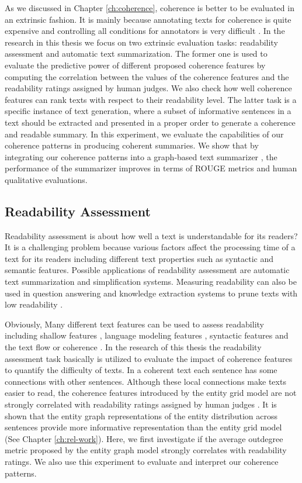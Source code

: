 As we discussed in Chapter \ref{ch:coherence}, coherence is better to be evaluated in an extrinsic fashion. 
It is mainly because annotating texts for coherence is quite expensive and controlling all conditions for annotators is very difficult \cite{karamanis04a}. 
In the research in this thesis we focus on two extrinsic evaluation tasks: readability assessment and automatic text summarization. 
The former one is used to evaluate the predictive power of different proposed coherence features by computing the correlation between the values of the coherence features and the readability ratings assigned by human judges. 
We also check how well coherence features can rank texts with respect to their readability level. 
The latter task is a specific instance of text generation, where a subset of informative sentences in a text should be extracted and presented in a proper order to generate a coherence and readable summary. 
In this experiment, we evaluate the capabilities of our coherence patterns in producing coherent summaries. 
We show that by integrating our coherence patterns into a graph-based text summarizer \cite{parveen15a}, the performance of the summarizer improves in terms of ROUGE metrics and human qualitative evaluations.

\subsection{Readability Assessment}
\label{subsec:readability_assessment}

Readability assessment is about how well a text is understandable for its readers? 
It is a challenging problem because various factors affect the processing time of a text for its readers including different text properties such as syntactic and semantic features.
Possible applications of readability assessment are automatic text summarization and simplification systems. 
Measuring readability can also be used in question answering and knowledge extraction systems to prune texts with low readability \cite{kate10}. 

Obviously, Many different text features can be used to assess readability including shallow features \cite{flesch48,kincaid75}, language modeling features \cite{siluo01,collins-thompson04}, syntactic features \cite{schwarm05} and the text flow or coherence \cite{barzilay08,pitler08}.
In the research of this thesis the readability assessment task basically is utilized to evaluate the impact of coherence features to quantify the difficulty of texts.  
In a coherent text each sentence has some connections with other sentences. 
Although these local connections make texts easier to read, the coherence features introduced by the entity grid model \cite{barzilay08} are not strongly correlated with readability ratings assigned by human judges \cite{pitler08}.  
It is shown that the entity graph representations of the entity distribution across sentences provide more informative representation than the entity grid model (See Chapter \ref{ch:rel-work}).  
Here, we first investigate if the average outdegree metric proposed by the entity graph model strongly correlates with readability ratings. 
We also use this experiment to evaluate and interpret our coherence patterns. 

